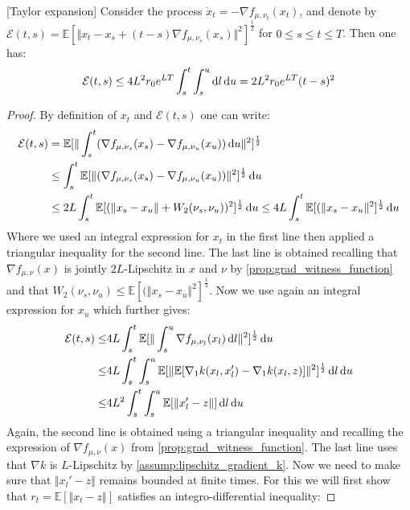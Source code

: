 \begin{lemma}\label{lem:Taylor-expansion}[Taylor expansion]
	Consider the process $ \dot{x}_t = - \nabla f_{\mu,\nu_t}(x_t) $, and denote by $\mathcal{E}(t,s) = \mathbb{E}[ \Vert x_t - x_s +(t-s)\nabla f_{\mu,\nu_s}(x_s) \Vert ^2 ]^{\frac{1}{2}} $ for $0\leq s \leq t \leq T$. Then one has:
	\begin{align}
		\mathcal{E}(t,s)\leq 4L^2 r_0 e^{LT} \int_{s}^t \int_s^u \mathop{}\!\mathrm{d} l \mathop{}\!\mathrm{d} u = 2L^2 r_0 e^{LT}(t-s)^2
	\end{align}
\end{lemma}
\begin{proof}
	By definition of $x_t$ and $\mathcal{E}(t,s)$ one can write:
	\begin{align*}
		\mathcal{E}(t,s) 
		&=
		\mathbb{E}[\Vert \int_{s}^t (\nabla f_{\mu,\nu_s}(x_s) - \nabla f_{\mu,\nu_u}(x_u))\mathop{}\!\mathrm{d} u  \Vert^2 ]^{\frac{1}{2}} \\
		&\leq
		\int_{s}^t  \mathbb{E}[\Vert (\nabla f_{\mu,\nu_s}(x_s) - \nabla f_{\mu,\nu_u}(x_u))  \Vert^2 ]^{\frac{1}{2}} \mathop{}\!\mathrm{d} u\\
		&\leq
		2L\int_{s}^t  \mathbb{E}[(\Vert  x_s - x_u \Vert + W_2(\nu_s,\nu_u))^2 ]^{\frac{1}{2}} \mathop{}\!\mathrm{d} u \leq 4L\int_{s}^t   \mathbb{E}[(\Vert  x_s - x_u \Vert^2]^{\frac{1}{2}}\mathop{}\!\mathrm{d} u
	\end{align*}
	Where we used an integral expression for $x_t$ in the first line then applied a triangular inequality for the second line. The last line is obtained recalling that $\nabla f_{\mu,\nu}(x)$ is jointly $2L$-Lipschitz in $x$ and $\nu$ by \cref{prop:grad_witness_function} and that $W_2(\nu_s,\nu_u) \leq \mathbb{E}[(\Vert  x_s - x_u \Vert^2]^{\frac{1}{2}}$. Now we use again an integral expression for $x_u$ which further gives:
	\begin{align*}
		\mathcal{E}(t,s) \leq & 4L \int_{s}^t \mathbb{E}[\Vert \int_s^u  \nabla f_{\mu,\nu_l}(x_l) \mathop{}\!\mathrm{d} l \Vert^2 ]^{\frac{1}{2}}\mathop{}\!\mathrm{d} u\\
		\leq & 4L \int_{s}^t \int_s^u  \mathbb{E}[ \Vert \mathbb{E}[ \nabla_1 k(x_l,x_l') - \nabla_1 k(x_l,z) ]   \Vert^2  ]^\frac{1}{2}\mathop{}\!\mathrm{d} l\mathop{}\!\mathrm{d} u\\
		\leq &
		4L^2 \int_{s}^t \int_s^u   \mathbb{E}[\Vert x_l' - z \Vert] \mathop{}\!\mathrm{d} l \mathop{}\!\mathrm{d} u
	\end{align*}
	Again, the second line is obtained using a triangular inequality and recalling the expression of $\nabla f_{\mu,\nu}(x)$ from \cref{prop:grad_witness_function}. The last line uses that $\nabla k$ is $L$-Lipschitz by \cref{assump:lipschitz_gradient_k}. Now we need to make sure that $\Vert x_l' - z \Vert$ remains bounded at finite times. For this we will first show that $ r_t = \mathbb{E}[\Vert x_t - z \Vert]$ satisfies an integro-differential inequality: 

\end{proof}

